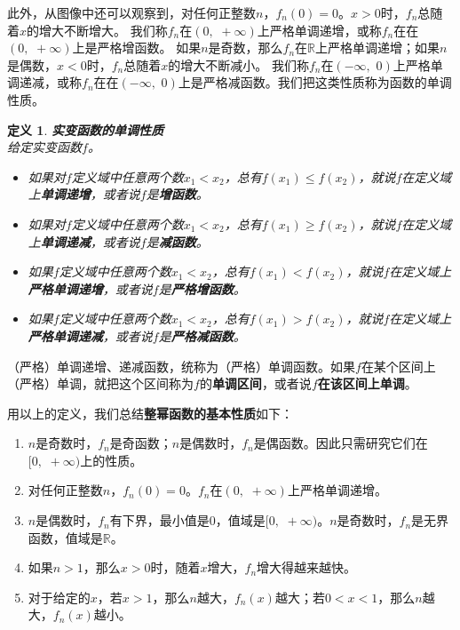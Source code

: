 \documentclass[12pt,UTF8]{ctexbook}
\newtheorem{df}{定义}[section]
\begin{document}
此外，从图像中还可以观察到，对任何正整数$n$，$f_n(0) = 0$。$x>0$时，$f_n$总随着$x$的增大不断增大。
我们称$f_n$在$(0, \,\, +\infty)$上严格单调递增，或称$f_n$在在$(0, \,\, +\infty)$上是严格增函数。
如果$n$是奇数，那么$f_n$在$\mathbb{R}$上严格单调递增；如果$n$是偶数，$x<0$时，$f_n$总随着$x$的增大不断减小。
我们称$f_n$在$(-\infty,\,\, 0)$上严格单调递减，或称$f_n$在在$(-\infty,\,\, 0)$上是严格减函数。我们把这类性质称为函数的单调性质。
\begin{df}\textbf{实变函数的单调性质}\\
    给定实变函数$f$。
    \begin{itemize}
        \item 如果对$f$定义域中任意两个数$x_1 < x_2$，总有$f(x_1) \leqslant f(x_2)$，就说$f$在定义域上\textbf{单调递增}，或者说$f$是\textbf{增函数}。
        \item 如果对$f$定义域中任意两个数$x_1 < x_2$，总有$f(x_1) \geqslant f(x_2)$，就说$f$在定义域上\textbf{单调递减}，或者说$f$是\textbf{减函数}。
        \item 如果$f$定义域中任意两个数$x_1 < x_2$，总有$f(x_1) < f(x_2)$，就说$f$在定义域上\textbf{严格单调递增}，或者说$f$是\textbf{严格增函数}。
        \item 如果$f$定义域中任意两个数$x_1 < x_2$，总有$f(x_1) > f(x_2)$，就说$f$在定义域上\textbf{严格单调递减}，或者说$f$是\textbf{严格减函数}。   
    \end{itemize}
\end{df}

（严格）单调递增、递减函数，统称为（严格）单调函数。如果$f$在某个区间上（严格）单调，就把这个区间称为$f$的\textbf{单调区间}，或者说$f$\textbf{在该区间上单调}。

用以上的定义，我们总结\textbf{整幂函数的基本性质}如下：
\begin{enumerate}
    \item $n$是奇数时，$f_n$是奇函数；$n$是偶数时，$f_n$是偶函数。因此只需研究它们在$[0, \,\, +\infty)$上的性质。
    \item 对任何正整数$n$，$f_n(0) = 0$。$f_n$在$(0, \,\, +\infty)$上严格单调递增。
    \item $n$是偶数时，$f_n$有下界，最小值是$0$，值域是$[0, \,\, +\infty)$。$n$是奇数时，$f_n$是无界函数，值域是$\mathbb{R}$。
    \item 如果$n>1$，那么$x>0$时，随着$x$增大，$f_n$增大得越来越快。
    \item 对于给定的$x$，若$x>1$，那么$n$越大，$f_n(x)$越大；若$0 < x<1$，那么$n$越大，$f_n(x)$越小。
\end{enumerate}
\end{document}
